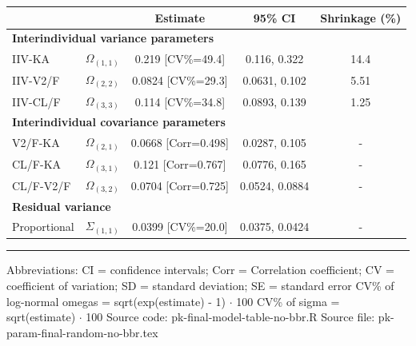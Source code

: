 \setlength{\tabcolsep}{5pt} 
\begin{threeparttable}
\renewcommand{\arraystretch}{1.3}
\begin{tabular}[h]{lcccc}
\hline
 &  & Estimate & 95\% CI & Shrinkage (\%) \\
\hline
\multicolumn{5}{l}{\textbf{Interindividual variance parameters}}\\%
IIV-KA & $\Omega_{(1,1)}$ & 0.219 [CV\%=49.4] & 0.116, 0.322 & 14.4 \\
IIV-V2/F & $\Omega_{(2,2)}$ & 0.0824 [CV\%=29.3] & 0.0631, 0.102 & 5.51 \\
IIV-CL/F & $\Omega_{(3,3)}$ & 0.114 [CV\%=34.8] & 0.0893, 0.139 & 1.25 \\
\hline \multicolumn{5}{l}{\textbf{Interindividual covariance parameters}}\\%
V2/F-KA & $\Omega_{(2,1)}$ & 0.0668 [Corr=0.498] & 0.0287, 0.105 & - \\
CL/F-KA & $\Omega_{(3,1)}$ & 0.121 [Corr=0.767] & 0.0776, 0.165 & - \\
CL/F-V2/F & $\Omega_{(3,2)}$ & 0.0704 [Corr=0.725] & 0.0524, 0.0884 & - \\
\hline \multicolumn{5}{l}{\textbf{Residual variance}}\\%
Proportional & $\Sigma_{(1,1)}$ & 0.0399 [CV\%=20.0] & 0.0375, 0.0424 & - \\
\hline
\end{tabular}
\end{threeparttable}
 
\vspace{0.67cm}
 
\begin{minipage}{1\linewidth}
\linespread{1.1}\selectfont
\rule{1\linewidth}{0.4pt}
\vspace{0.02cm}
Abbreviations: CI = confidence intervals; 
                        Corr = Correlation coefficient;
                        CV = coefficient of variation;
                        SD = standard deviation;
                        SE = standard error \newline
CV\% of log-normal omegas = sqrt(exp(estimate) - 1) $\cdot$ 100 \newline
CV\% of sigma = sqrt(estimate) $\cdot$ 100 \newline
Source code: pk-final-model-table-no-bbr.R \newline
Source file: pk-param-final-random-no-bbr.tex \newline
\end{minipage}
